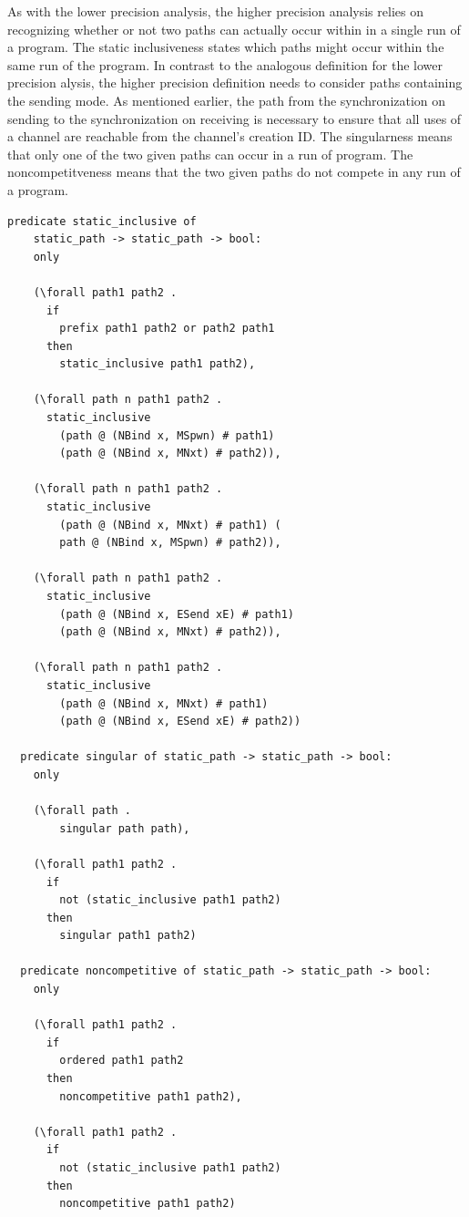 \documentclass[10pt]{article}
\begin{document}
As with the lower precision analysis, the higher precision analysis relies on recognizing
whether or not two paths can actually occur within in a single run of a program. The static
inclusiveness states which paths might occur within the same run of the program.
In contrast to the analogous definition for the lower precision
alysis, the higher precision definition needs to consider paths containing the
sending mode.  As mentioned earlier, the path from the synchronization on sending to the
synchronization on receiving is necessary to ensure that all uses of a channel are reachable
from the channel's creation ID.  The singularness means that only one of the two
given paths can occur in a run of program.  The noncompetitveness means that the two
given paths do not compete in any run of a program. 

\begin{lstlisting}[language=logic, mathescape]
  predicate static_inclusive of
    static_path -> static_path -> bool:
    only

    (\forall path1 path2 .
      if
        prefix path1 path2 or path2 path1
      then
        static_inclusive path1 path2),

    (\forall path n path1 path2 .
      static_inclusive
        (path @ (NBind x, MSpwn) # path1)
        (path @ (NBind x, MNxt) # path2)),

    (\forall path n path1 path2 .
      static_inclusive
        (path @ (NBind x, MNxt) # path1) (
        path @ (NBind x, MSpwn) # path2)),

    (\forall path n path1 path2 .
      static_inclusive
        (path @ (NBind x, ESend xE) # path1)
        (path @ (NBind x, MNxt) # path2)),

    (\forall path n path1 path2 .
      static_inclusive
        (path @ (NBind x, MNxt) # path1)
        (path @ (NBind x, ESend xE) # path2))

  predicate singular of static_path -> static_path -> bool:
    only 

    (\forall path .
        singular path path),

    (\forall path1 path2 .
      if
        not (static_inclusive path1 path2)
      then
        singular path1 path2)

  predicate noncompetitive of static_path -> static_path -> bool:
    only

    (\forall path1 path2 . 
      if
        ordered path1 path2
      then
        noncompetitive path1 path2),

    (\forall path1 path2 .
      if
        not (static_inclusive path1 path2)
      then
        noncompetitive path1 path2)
  \end{lstlisting}
\end{document}
